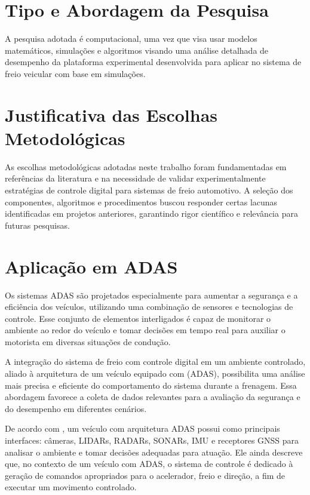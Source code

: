 

\section{Tipo e Abordagem da Pesquisa}
\label{sec:metodologia-1}
A pesquisa adotada é computacional, uma vez que visa usar modelos matemáticos, simulações e algoritmos visando uma análise detalhada de desempenho da plataforma experimental desenvolvida para aplicar no sistema de freio veicular com base em simulações.


\section{Justificativa das Escolhas Metodológicas}
\label{sec:metodologia-2}
As escolhas metodológicas adotadas neste trabalho foram fundamentadas em referências da literatura e na necessidade de validar experimentalmente estratégias de controle digital para sistemas de freio automotivo. A seleção dos componentes, algoritmos e procedimentos buscou responder certas lacunas identificadas em projetos anteriores, garantindo rigor científico e relevância para futuras pesquisas.


\section{Aplicação em ADAS}
\label{sec:metodologia-3}

Os sistemas ADAS são projetados especialmente para aumentar a segurança e a eficiência dos veículos, utilizando uma combinação de sensores e tecnologias de controle. Esse conjunto de elementos interligados é capaz de monitorar o ambiente ao redor do veículo e tomar decisões em tempo real para auxiliar o motorista em diversas situações de condução. 

A integração do sistema de freio com controle digital em um ambiente controlado, aliado à arquitetura de um veículo equipado com (ADAS), possibilita uma análise mais precisa e eficiente do comportamento do sistema durante a frenagem. Essa abordagem favorece a coleta de dados relevantes para a avaliação da segurança e do desempenho em diferentes cenários.

De acordo com , um veículo com arquitetura ADAS possui como principais interfaces: câmeras, LIDARs, RADARs, SONARs, \gls{IMU} e receptores \gls{GNSS} para analisar o ambiente e tomar decisões adequadas para atuação. Ele ainda descreve que, no contexto de um veículo com ADAS, o sistema de controle é dedicado à geração de comandos apropriados para o acelerador, freio e direção, a fim de executar um movimento controlado.

